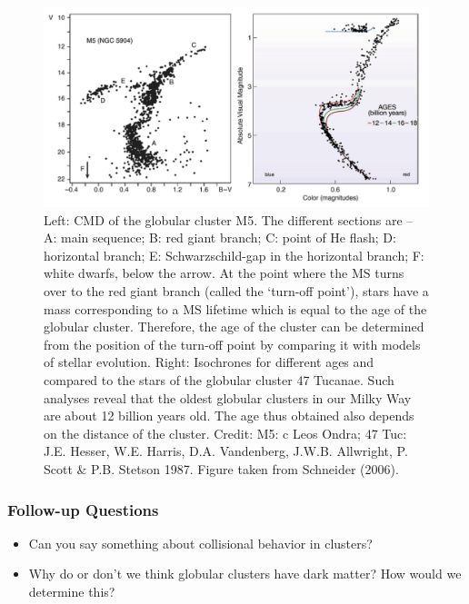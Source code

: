\documentclass[a4paper,11pt]{article}
\begin{document}
\begin{figure}[t!]
    \includegraphics[width=16cm]{figures/GlobularClusters.png}
    \centering
    \caption{\footnotesize{Left: CMD of the globular cluster M5. The different sections are -- A: main sequence; B: red giant branch; C: point of He flash; D: horizontal branch; E: Schwarzschild-gap in the horizontal branch; F: white dwarfs, below the arrow. At the point where the MS turns over to the red giant branch (called the `turn-off point'), stars have a mass corresponding to a MS lifetime which is equal to the age of the globular cluster. Therefore, the age of the cluster can be determined from the position of the turn-off point by comparing it with models of stellar evolution. Right: Isochrones for different ages and compared to the stars of the globular cluster 47 Tucanae. Such analyses reveal that the oldest globular clusters in our Milky Way are about 12 billion years old. The age thus obtained also depends on the distance of the cluster. Credit: M5: c Leos Ondra; 47 Tuc: J.E. Hesser, W.E. Harris, D.A. Vandenberg, J.W.B. Allwright, P. Scott \& P.B. Stetson 1987. Figure taken from Schneider (2006).}}
    \label{fig:globularclusters}
\end{figure}

\subsubsection{Follow-up Questions}

\begin{itemize}
    \item Can you say something about collisional behavior in clusters?
    \item Why do or don't we think globular clusters have dark matter? How would we determine this? 
\end{itemize}
\end{document}
